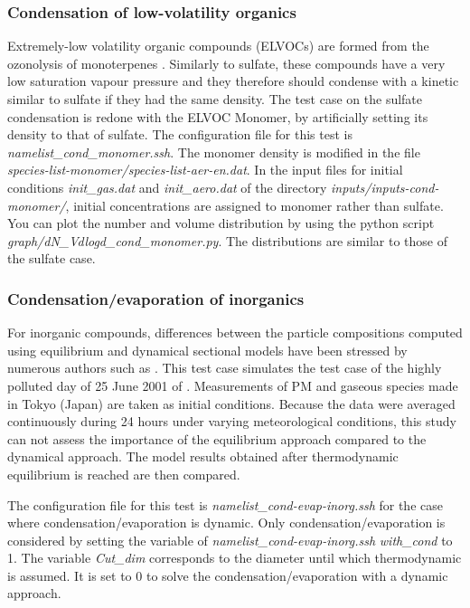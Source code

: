 \documentclass[a4paper,11pt]{article}
\begin{document}
\subsubsection{Condensation of low-volatility organics}

Extremely-low volatility organic compounds (ELVOCs) are formed from the ozonolysis of monoterpenes \cite{chrit2017} .
Similarly to sulfate, these compounds have a very low saturation vapour pressure and they therefore should condense with a kinetic similar to sulfate if they had the same density.
The test case on the sulfate condensation is redone with the ELVOC Monomer, by artificially setting its density to that of sulfate.
The configuration file for this test is {\it{namelist\_cond\_monomer.ssh}}.
The monomer density is modified in the file {\it{species-list-monomer/species-list-aer-en.dat}}.
In the input files for initial conditions {\it{init\_gas.dat}} and {\it{init\_aero.dat}} of the directory {\it{inputs/inputs-cond-monomer/}}, initial concentrations are assigned to monomer rather than sulfate. You can plot the number and volume distribution by using the python script {\it{graph/dN\_Vdlogd\_cond\_monomer.py}}. 
The distributions are similar to those of the sulfate case.

\subsubsection{Condensation/evaporation of inorganics}
For inorganic compounds, differences between the particle compositions computed using equilibrium and dynamical sectional models have been stressed by numerous authors such as \cite{sartelet2006}. This test case simulates the test case of the highly polluted day of 25 June 2001 of \cite{sartelet2006} .
Measurements of PM and gaseous species made in Tokyo (Japan) are taken as initial conditions. Because the data were averaged continuously during 24 hours under varying meteorological conditions, this study can not assess the importance of the equilibrium approach compared to the dynamical approach. The model results obtained after thermodynamic equilibrium is reached are then compared.

The configuration file for this test is {\it{namelist\_cond-evap-inorg.ssh}} for the case where condensation/evaporation is dynamic. 
Only condensation/evaporation is considered by setting the variable of {\it{namelist\_cond-evap-inorg.ssh}} {\it{with\_cond}} to 1.
The variable {\it{Cut\_dim}} corresponds to the diameter until which thermodynamic is assumed. It is set to 0 to solve the condensation/evaporation with a dynamic approach. 
\end{document}
